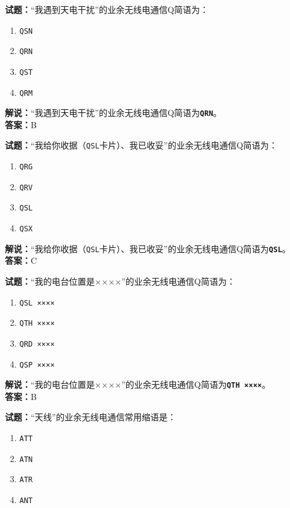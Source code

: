 \documentclass{ctexbook}
\begin{document}
\bigskip


\noindent\textbf{试题：}“我遇到天电干扰”的业余无线电通信Q简语为：

\begin{enumerate}[leftmargin=3em]
	\item \texttt{QSN}
	\item \texttt{QRN}
	\item \texttt{QST}
	\item \texttt{QRM}
\end{enumerate}

\noindent\textbf{解说：}“我遇到天电干扰”的业余无线电通信Q简语为\texttt{\textbf{QRN}}。\\\noindent\textbf{答案：}B


\bigskip


\noindent\textbf{试题：}“我给你收据（\texttt{QSL}卡片）、我已收妥”的业余无线电通信Q简语为：

\begin{enumerate}[leftmargin=3em]
	\item \texttt{QRG}
	\item \texttt{QRV}
	\item \texttt{QSL}
	\item \texttt{QSX}
\end{enumerate}

\noindent\textbf{解说：}“我给你收据（\texttt{QSL}卡片）、我已收妥”的业余无线电通信Q简语为\texttt{\textbf{QSL}}。\\\noindent\textbf{答案：}C


\bigskip


\noindent\textbf{试题：}“我的电台位置是××××”的业余无线电通信Q简语为：

\begin{enumerate}[leftmargin=3em]
	\item \texttt{QSL ××××}
	\item \texttt{QTH ××××}
	\item \texttt{QRD ××××}
	\item \texttt{QSP ××××}
\end{enumerate}

\noindent\textbf{解说：}“我的电台位置是××××”的业余无线电通信Q简语为\texttt{\textbf{QTH ××××}}。\\\noindent\textbf{答案：}B


\bigskip


\noindent\textbf{试题：}“天线”的业余无线电通信常用缩语是：

\begin{enumerate}[leftmargin=3em]
	\item \texttt{ATT}
	\item \texttt{ATN}
	\item \texttt{ATR}
	\item \texttt{ANT}
\end{enumerate}
\end{document}

